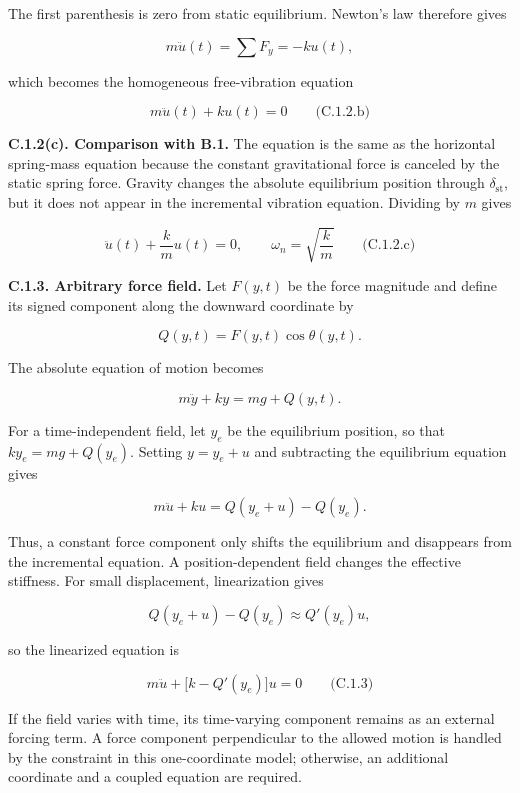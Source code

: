The first parenthesis is zero from static equilibrium. Newton's law therefore gives

\[
m\ddot{u}(t)=\sum F_y=-ku(t),
\]

which becomes the homogeneous free-vibration equation

\[
\boxed{m\ddot{u}(t)+ku(t)=0}
\qquad\text{(C.1.2.b)}
\]

\textbf{C.1.2(c). Comparison with B.1.} The equation is the same as the horizontal spring-mass equation because the constant gravitational force is canceled by the static spring force. Gravity changes the absolute equilibrium position through \(\delta_{\mathrm{st}}\), but it does not appear in the incremental vibration equation. Dividing by \(m\) gives

\[
\boxed{\ddot{u}(t)+\frac{k}{m}u(t)=0,
\qquad \omega_n=\sqrt{\frac{k}{m}}}
\qquad\text{(C.1.2.c)}
\]

\textbf{C.1.3. Arbitrary force field.} Let \(F(y,t)\) be the force magnitude and define its signed component along the downward coordinate by

\[
Q(y,t)=F(y,t)\cos\theta(y,t).
\]

The absolute equation of motion becomes

\[
m\ddot{y}+ky=mg+Q(y,t).
\]

For a time-independent field, let \(y_e\) be the equilibrium position, so that \(ky_e=mg+Q(y_e)\). Setting \(y=y_e+u\) and subtracting the equilibrium equation gives

\[
m\ddot{u}+ku=Q(y_e+u)-Q(y_e).
\]

Thus, a constant force component only shifts the equilibrium and disappears from the incremental equation. A position-dependent field changes the effective stiffness. For small displacement, linearization gives

\[
Q(y_e+u)-Q(y_e)\approx Q'(y_e)u,
\]

so the linearized equation is

\[
\boxed{m\ddot{u}+\bigl[k-Q'(y_e)\bigr]u=0}
\qquad\text{(C.1.3)}
\]

If the field varies with time, its time-varying component remains as an external forcing term. A force component perpendicular to the allowed motion is handled by the constraint in this one-coordinate model; otherwise, an additional coordinate and a coupled equation are required.

\endgroup
